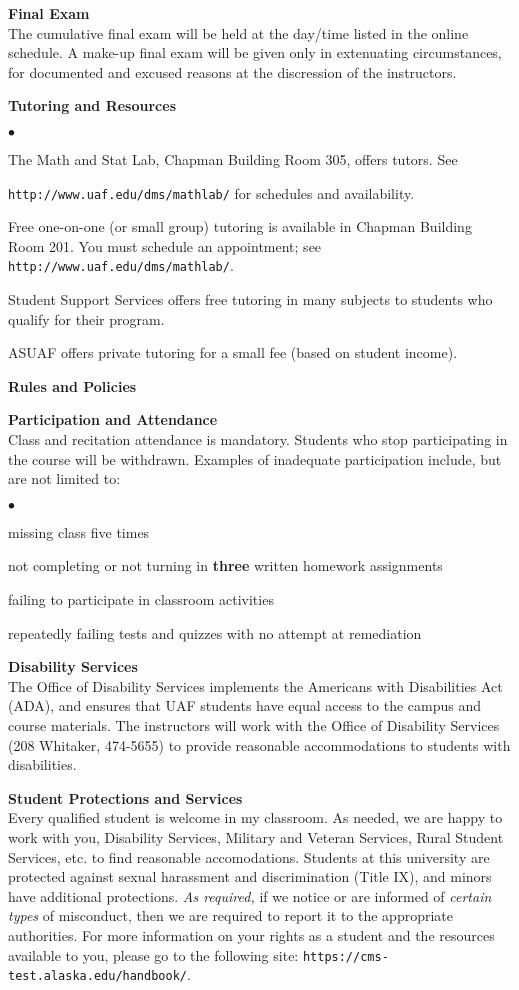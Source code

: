 \documentclass[12pt]{article}
\renewcommand{\emph}[1]{\textsf{\textbf{#1}}}
\newcommand{\localhead}[1]{\par\smallskip\textbf{#1}\nobreak\\}%
\def\heading#1{\localhead{\large\emph{#1}}}
\def\subheading#1{\localhead{\emph{#1}}}
\newenvironment{clist}%
{\bgroup\parskip 0pt\begin{list}{$\bullet$}{\partopsep 4pt\topsep 0pt\itemsep -2pt}}%
{\end{list}\egroup}%
\begin{document}
\heading{Final Exam}
The cumulative final exam will be held at the day/time listed in the online schedule. A make-up final exam will be given only in extenuating circumstances, for documented and excused reasons at the discression of the instructors.

\heading{Tutoring and Resources}
\vskip -30pt\strut
\begin{clist}
	\item The Math and Stat Lab, Chapman Building Room 305, offers tutors.  See

\texttt{http://www.uaf.edu/dms/mathlab/} for schedules and availability.
	\item Free one-on-one (or small group) tutoring is available in Chapman Building Room 201. You must schedule an appointment; see \texttt{http://www.uaf.edu/dms/mathlab/}.
	\item Student Support Services offers free tutoring in many subjects to students who qualify for their program.
	\item ASUAF offers private tutoring for a small fee (based on student income).
\end{clist}

\heading{Rules and Policies}
\vskip -20pt
\subheading{Participation and Attendance}
Class and recitation attendance is mandatory. Students who stop participating in the course will be withdrawn. Examples of inadequate participation include,
but are not limited to:
\begin{clist}
\item missing class five times
\item not completing or not turning in \textbf{three} written homework assignments
\item failing to participate in classroom activities
\item repeatedly failing tests and quizzes with no attempt at remediation
\end{clist}

\subheading{Disability Services}
The Office of Disability Services implements the
Americans with Disabilities Act (ADA), and ensures that UAF students
have equal access to the campus and course materials. The instructors will work with
the Office of Disability Services (208 Whitaker, 474-5655) to provide
reasonable accommodations to students with disabilities.

\subheading{Student Protections and Services}
Every qualified student is welcome in my classroom.  As needed, we are happy to
work with you, Disability Services, Military and Veteran Services, Rural Student Services,
etc. to find reasonable accomodations. Students at this university are protected
against sexual harassment and discrimination (Title IX), and minors have
additional protections. \textit{As required,} if we notice or are informed
of \textit{certain types} of misconduct, then we are required to report it
to the appropriate authorities.  For more information on your rights as a
student and the resources available to you, please go to the following site:
\texttt{https://cms-test.alaska.edu/handbook/}.
\end{document}

